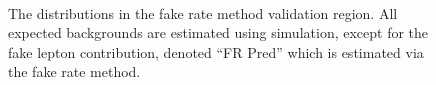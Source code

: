 \begin{figure}
  \begin{center}
  \\
  \caption{The \ptmiss distributions in the fake rate method validation region. All expected backgrounds are estimated using simulation, except for the fake lepton contribution, denoted ``FR Pred'' which is estimated via the fake rate method.}
  \label{fig:fr_close}
  \end{center}
\end{figure}
